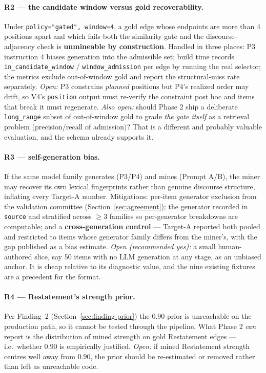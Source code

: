 \documentclass[11pt]{article}
\begin{document}
\paragraph{R2 --- the candidate window versus gold recoverability.}
Under \texttt{policy="gated", window=4}, a gold edge whose endpoints are more than 4 positions
apart and which fails both the similarity gate and the discourse-adjacency check is
\textbf{unmineable by construction}. Handled in three places: P3 instruction 4 biases generation
into the admissible set; build time records \texttt{in\_candidate\_window} /
\texttt{window\_admission} per edge by running the real selector; the metrics exclude
out-of-window gold and report the structural-miss rate separately. \emph{Open:} P3 constrains
\emph{planned} positions but P4's realized order may drift, so V4's \texttt{position} output must
re-verify the constraint post hoc and items that break it must regenerate. \emph{Also open:}
should Phase 2 ship a deliberate \texttt{long\_range} subset of out-of-window gold to grade
\emph{the gate itself} as a retrieval problem (precision/recall of admission)? That is a
different and probably valuable evaluation, and the schema already supports it.

\paragraph{R3 --- self-generation bias.}
If the same model family generates (P3/P4) and mines (Prompt A/B), the miner may recover its own
lexical fingerprints rather than genuine discourse structure, inflating every Target-A number.
Mitigations: per-item generator exclusion from the validation committee
(Section~\ref{sec:agreement}); the generator recorded in \texttt{source} and stratified across
$\geq 3$ families so per-generator breakdowns are computable; and a \textbf{cross-generation
control} --- Target-A reported both pooled and restricted to items whose generator family
differs from the miner's, with the gap published as a bias estimate. \emph{Open (recommended
yes):} a small human-authored slice, say 50 items with no LLM generation at any stage, as an
unbiased anchor. It is cheap relative to its diagnostic value, and the nine existing fixtures
are a precedent for the format.

\paragraph{R4 --- Restatement's strength prior.}
Per Finding~2 (Section~\ref{sec:finding-prior}) the $0.90$ prior is unreachable on the
production path, so it cannot be tested through the pipeline. What Phase 2 \emph{can} report is
the distribution of mined strength on gold Restatement edges --- i.e.\ whether $0.90$ is
empirically justified. \emph{Open:} if mined Restatement strength centres well away from
$0.90$, the prior should be re-estimated or removed rather than left as unreachable code.
\end{document}
